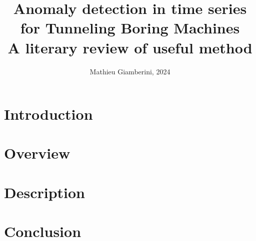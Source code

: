 \documentclass[twocolumn]{article}
\title{Anomaly detection in time series for Tunneling Boring Machines \\ \small{A literary review of useful method}}
\author{Mathieu Giamberini, 2024}
\date{}
\begin{document}
    \maketitle
    
    
        \section*{Introduction}
            


        \section{Overview}
            


        \section{Description}
            


        \section*{Conclusion}
            
    

    \printbibliography

    \newpage
    \onecolumn
    
\end{document}
